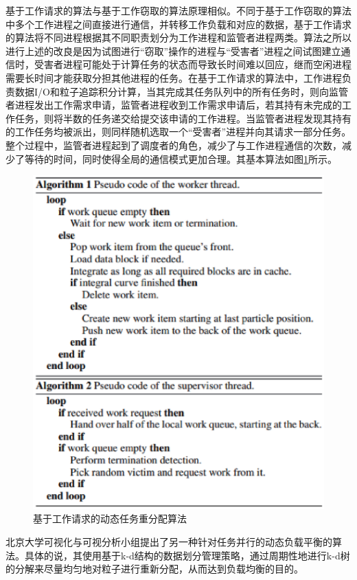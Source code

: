 基于工作请求的算法与基于工作窃取的算法原理相似。不同于基于工作窃取的算法中多个工作进程之间直接进行通信，并转移工作负载和对应的数据，基于工作请求的算法将不同进程根据其不同职责划分为工作进程和监管者进程两类\parencite{MullerCHG13}。算法之所以进行上述的改良是因为试图进行“窃取”操作的进程与“受害者”进程之间试图建立通信时，受害者进程可能处于计算任务的状态而导致长时间难以回应，继而空闲进程需要长时间才能获取分担其他进程的任务。在基于工作请求的算法中，工作进程负责数据I/O和粒子追踪积分计算，当其完成其任务队列中的所有任务时，则向监管者进程发出工作需求申请，监管者进程收到工作需求申请后，若其持有未完成的工作任务，则将半数的任务递交给提交该申请的工作进程。当监管者进程发现其持有的工作任务均被派出，则同样随机选取一个“受害者”进程并向其请求一部分任务。整个过程中，监管者进程起到了调度者的角色，减少了与工作进程通信的次数，减少了等待的时间，同时使得全局的通信模式更加合理。其基本算法如图\ref{fig:loadbalance:workrequesting}所示。

\begin{figure}[!tb]
  \centering
  \includegraphics[width=0.8\linewidth,keepaspectratio]{image/loadbalance/workrequesting.eps}
  \caption{
    基于工作请求的动态任务重分配算法\parencite{MullerCHG13}
 }
\label{fig:loadbalance:workrequesting}
\end{figure}

北京大学可视化与可视分析小组提出了另一种针对任务并行的动态负载平衡的算法\parencite{ZhangGHYP18}。具体的说，其使用基于k-d结构的数据划分管理策略，通过周期性地进行k-d树的分解来尽量均匀地对粒子进行重新分配，从而达到负载均衡的目的。

